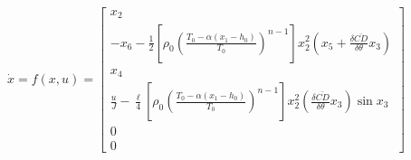 \documentclass{article}
\begin{document}
  \begin{equation}
    \dot{x} = f(x,u) = \left[\begin{matrix} x_2 \\
                                            -x_6 -\frac{1}{2} \left[\rho_0 \left(   \frac{T_0 - \alpha\left( x_1-h_0 \right)}{T_0}   \right)^{n-1}\right] x_2^2 \left(x_5 + \frac{\delta\bar{CD}}{\delta\theta} x_3 \right) \\
                                            x_4 \\
                                            \frac{u}{J} - \frac{\ell}{4} \left[ \rho_0 \left(   \frac{T_0 - \alpha\left( x_1-h_0 \right)}{T_0}   \right)^{n-1} \right] x_2^2 \left(\frac{\delta\bar{CD}}{\delta\theta} x_3 \right) \sin x_3 \\
                                            0 \\
                                            0        \end{matrix}\right]
  \end{equation}
\end{document}
